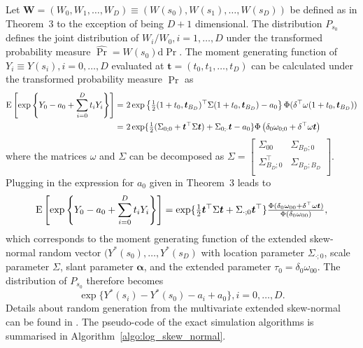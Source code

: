 \documentclass[lineno]{biometrika}
\begin{document}
Let $\bm W = (W_0, W_1, \ldots, W_D) \equiv \left( W(s_0), W(s_1), \ldots, W(s_D)\right)$ be defined as in Theorem~3 to the exception of being $D+1$ dimensional.
The distribution $P_{s_0}$ defines the joint distribution of $W_i/W_0, i=1,\dots,D$ under the transformed probability measure $\hat \Pr = W(s_0)\text{d}\Pr$. The moment generating function of $Y_i \equiv Y(s_i),i=0,\dots,D$ evaluated at $\bm t = (t_0, t_1, \ldots, t_D)$ can be calculated under the transformed probability measure $\hat\Pr$ as
\begin{align*}
	{\rm E}\left[\exp\left\{Y_0-a_0 + \sum_{i=0}^D t_i Y_i\right\}\right]
	=&\ 2\exp\left\{{\textstyle{1\over2}}(1+t_0,\bm t_{B_D})^\top\Sigma(1+t_0,\bm t_{B_D})-a_0 \right\} \Phi(\delta^\top\omega(1+t_0,\bm t_{B_D}))\\
	 =&\ 2\exp\{{\textstyle{1\over2}}(\Sigma_{0;0} + \bm t^\top\Sigma \bm t) + \Sigma_{0;\cdot} \bm t - a_0\}\Phi\left(\delta_0\omega_{0;0} + \delta^\top\omega \bm t\right) 
\end{align*}        
where the matrices $\omega$ and $\Sigma$ can be decomposed as $\Sigma = \begin{bmatrix}
	\Sigma_{00} & \Sigma_{B_D;0} \\
	\Sigma_{B_D;0}^\top & \Sigma_{B_D;B_D} \\
\end{bmatrix}$. 
%
Plugging in the expression for $a_0$ given in Theorem~3 leads to 
%
\begin{equation*}
{\rm E}\left[\exp\left\{Y_0-a_0 + \sum_{i=0}^D t_i Y_i\right\}\right] = \exp\{{\textstyle{1\over2}} \bm t^\top\Sigma \bm t + \Sigma_{\cdot;0} \bm t^\top \} 
{\textstyle{\Phi(\delta_0\omega_{00} + \delta^\top\omega \bm t)\over\Phi(\delta_0\omega_{00})}}, 
\end{equation*}
%
which corresponds to the moment generating function of the extended skew-normal random vector $(Y^*(s_0),\ldots,Y^*(s_D)$ with location parameter $\Sigma_{\cdot;0}$, scale parameter $\Sigma$, slant parameter $\bm\alpha$, and the extended parameter $\tau_0 = \delta_0\omega_{00}$. The distribution of $P_{s_0}$ therefore becomes 
%
$$\exp\{Y^*(s_i)-Y^*(s_0)-a_i + a_0\}, i=0,\dots,D.$$
%
Details about random generation from the multivariate extended skew-normal can be found in \cite[Chapter 5.3.3]{Azzalini:2013}. The pseudo-code of the exact simulation algorithms is summarised in Algorithm~\ref{algo:log_skew_normal}.   
 
\end{document}
